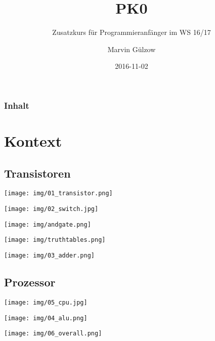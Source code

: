 \documentclass{beamer}
\title{PK0}
\subtitle{Zusatzkurs für Programmieranfänger im WS 16/17}
\author{Marvin Gülzow}
\institute{Universität Konstanz}
\date{2016-11-02}
\begin{document}
\frame{\maketitle}

\begin{frame}
\frametitle{Inhalt}
\tableofcontents
\end{frame}

\section{Kontext}
\subsection{Transistoren}
\begin{frame}{\subsecname}
  \centering
  \texttt{[image: img/01\_transistor.png]}  
\end{frame}

\begin{frame}{\subsecname}
  \centering
  \texttt{[image: img/02\_switch.jpg]}  
\end{frame}

\begin{frame}{\subsecname}
  \centering
  \texttt{[image: img/andgate.png]}  
\end{frame}

\begin{frame}{\subsecname}
  \centering
  \texttt{[image: img/truthtables.png]}  
\end{frame}

\begin{frame}{\subsecname}
  \centering
  \texttt{[image: img/03\_adder.png]}  
\end{frame}

\subsection{Prozessor}
\begin{frame}{\subsecname}
  \centering
  \texttt{[image: img/05\_cpu.jpg]}  
\end{frame}

\begin{frame}{\subsecname}
  \centering
  \texttt{[image: img/04\_alu.png]}  
\end{frame}

\begin{frame}{\subsecname}
  \centering
  \texttt{[image: img/06\_overall.png]}  
\end{frame}
\end{document}
